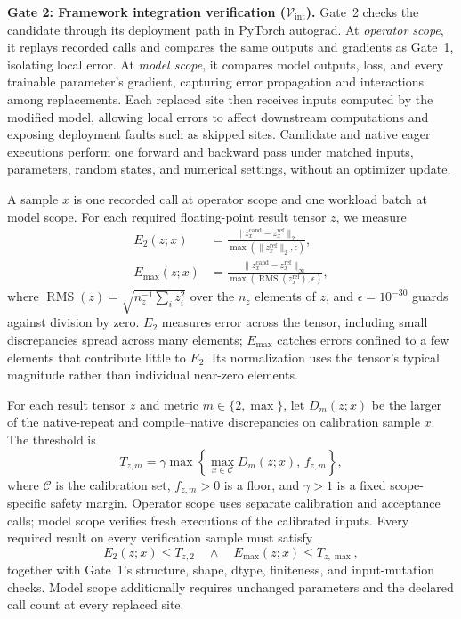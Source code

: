 \noindent\textbf{Gate 2: Framework integration verification ($\mathcal{V}_{\mathrm{int}}$).}
Gate~2 checks the candidate through its deployment path in PyTorch autograd. At \emph{operator scope}, it replays recorded calls and compares the same outputs and gradients as Gate~1, isolating local error. At \emph{model scope}, it compares model outputs, loss, and every trainable parameter's gradient, capturing error propagation and interactions among replacements. Each replaced site then receives inputs computed by the modified model, allowing local errors to affect downstream computations and exposing deployment faults such as skipped sites. Candidate and native eager executions perform one forward and backward pass under matched inputs, parameters, random states, and numerical settings, without an optimizer update.

A sample $x$ is one recorded call at operator scope and one workload batch at model scope. For each required floating-point result tensor $z$, we measure
\begin{equation}
\begin{aligned}
E_2(z;x)
&=\frac{\|z_x^{\mathrm{cand}}-z_x^{\mathrm{ref}}\|_2}{\max(\|z_x^{\mathrm{ref}}\|_2,\epsilon)},\\
E_{\max}(z;x)
&=\frac{\|z_x^{\mathrm{cand}}-z_x^{\mathrm{ref}}\|_\infty}{\max(\operatorname{RMS}(z_x^{\mathrm{ref}}),\epsilon)},
\end{aligned}
\label{eq:integration_errors}
\end{equation}
where $\operatorname{RMS}(z)=\sqrt{n_z^{-1}\sum_i z_i^2}$ over the $n_z$ elements of $z$, and $\epsilon=10^{-30}$ guards against division by zero. $E_2$ measures error across the tensor, including small discrepancies spread across many elements; $E_{\max}$ catches errors confined to a few elements that contribute little to $E_2$. Its normalization uses the tensor's typical magnitude rather than individual near-zero elements.

For each result tensor $z$ and metric $m\in\{2,\max\}$, let $D_m(z;x)$ be the larger of the native-repeat and compile--native discrepancies on calibration sample $x$. The threshold is
\begin{equation}
T_{z,m}=\gamma\max\left\{\max_{x\in\mathcal{C}}D_m(z;x),\,f_{z,m}\right\},
\label{eq:integration_calibration}
\end{equation}
where $\mathcal{C}$ is the calibration set, $f_{z,m}>0$ is a floor, and $\gamma>1$ is a fixed scope-specific safety margin. Operator scope uses separate calibration and acceptance calls; model scope verifies fresh executions of the calibrated inputs. Every required result on every verification sample must satisfy
\begin{equation}
E_2(z;x)\leq T_{z,2}
\quad\land\quad
E_{\max}(z;x)\leq T_{z,\max},
\label{eq:integration_acceptance}
\end{equation}
together with Gate~1's structure, shape, dtype, finiteness, and input-mutation checks. Model scope additionally requires unchanged parameters and the declared call count at every replaced site.

